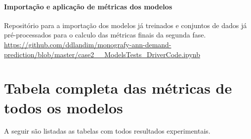	    \paragraph{Importação e aplicação de métricas dos modelos}
	         Repositório para a importação dos modelos já treinados e conjuntos de dados já pré-processados para o calculo das métricas finais da segunda fase. \url{https://github.com/ddlandim/monografy-ann-demand-prediction/blob/master/case2__ModelsTests_DriverCode.ipynb}
	        
\section{Tabela completa das métricas de todos os modelos}
        A seguir são listadas as tabelas com todos resultados experimentais.
     
